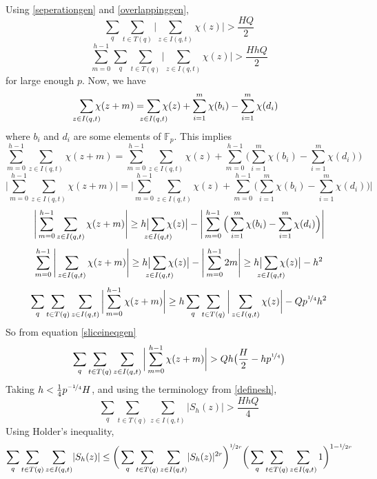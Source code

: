 \documentclass{report}
\begin{document}
Using \ref{seperationgen} and \ref{overlappinggen},
$$\sum_q\sum\limits_{t\in T(q)}\bigg \lvert\sum\limits_{z\in I(q,t)}\chi(z)\bigg \rvert >\frac{HQ}{2}$$
\begin{equation}
\sum\limits_{m=0}^{h-1}\sum_q\sum\limits_{t\in T(q)}\bigg \lvert\sum\limits_{z\in I(q,t)}\chi(z)\bigg \rvert > \frac{HhQ}{2}
\end{equation} \label{sliceineqgen}
for large enough $p$. Now, we have
$$\sum\limits_{\mathclap {z\in I(q,t)}}\chi(z+m)= \sum\limits_{\mathclap{z\in I(q,t)}}\chi(z) + \sum\limits_{i=1}^m\chi(b_i)-\sum\limits_{i=1}^m\chi(d_i)$$
where $b_i$ and $d_i$ are some elements of $\mathbb{F}_p$. This implies
$$\sum\limits_{m=0}^{h-1}\sum\limits_{z\in I(q,t)}\chi(z+m)= \sum\limits_{m=0}^{h-1}\sum\limits_{z\in I(q,t)}\chi(z) + \sum\limits_{m=0}^{h-1}\Big(\sum\limits_{i=1}^m\chi(b_i)-\sum\limits_{i=1}^m\chi(d_i)\Big)$$
$$\Bigg\lvert\sum\limits_{m=0}^{h-1}\sum\limits_{z\in I(q,t)}\chi(z+m)\Bigg\rvert= \Bigg\lvert\sum\limits_{m=0}^{h-1} \sum\limits_{z\in I(q,t)}\chi(z) + \sum\limits_{m=0}^{h-1}\Big(\sum\limits_{i=1}^m\chi(b_i)-\sum\limits_{i=1}^m \chi(d_i)\Big)\Bigg\rvert$$
$$\Bigg\lvert\sum\limits_{m=0}^{h-1}\sum\limits_{z\in I(q,t)}\chi(z+m)\Bigg\rvert \geq h\big\lvert\sum\limits_{\mathclap{ z\in I(q,t)}}\chi(z)\big\rvert -\Bigg\lvert\sum\limits_{m=0}^{h-1}\Big(\sum\limits_{i=1}^m\chi(b_i)-\sum\limits_{i=1}^m \chi(d_i)\Big)\Bigg\rvert$$
$$\sum\limits_{m=0}^{h-1}\Bigg\lvert\sum\limits_{z\in I(q,t)}\chi(z+m)\Bigg\rvert \geq h\big\lvert\sum\limits_{\mathclap{ z\in I(q,t)}}\chi(z)\big\rvert -\Bigg\lvert\sum\limits_{m=0}^{h-1}2m\Bigg\rvert \geq h\big\lvert\sum\limits_{\mathclap{z\in I(q,t)}}\chi(z)\big\rvert -h^2$$
$$\sum_q\sum\limits_{t\in T(q)}\sum\limits_{z\in I(q,t)}\bigg \lvert \sum\limits_{m=0}^{h-1}\chi(z+m) \bigg \rvert \geq h\sum_q\sum\limits_{t\in T(q)}\bigg \lvert \sum\limits_{z\in I(q,t)}\chi(z)\bigg \rvert-Qp^{\nicefrac{1}{4}}h^2$$
So from equation \ref{sliceineqgen}
$$\sum_q\sum\limits_{t\in T(q)}\sum\limits_{z\in I(q,t)}\bigg \lvert \sum\limits_{m=0}^{h-1}\chi(z+m) \bigg \rvert > Qh\big(\frac{H}{2}-hp^{\nicefrac{1}{4}}\big)$$
Taking $h<\frac{1}{4}p^{\nicefrac{-1}{4}}H$, and using the terminology from \ref{definesh},
$$\sum_q\sum\limits_{t\in T(q)}\sum\limits_{z\in I(q,t)}\lvert S_h(z) \rvert > \frac{HhQ}{4}$$
Using Holder's inequality,
$$\sum_q\sum\limits_{t\in T(q)}\sum\limits_{z\in I(q,t)}\lvert S_h(z) \rvert \leq \bigg ( \sum_q\sum\limits_{t\in T(q)}\sum\limits_{z\in I(q,t)}\lvert S_h(z) \rvert^{2r} \bigg )^{\nicefrac{1}{2r}}\bigg ( \sum_q\sum\limits_{t\in T(q)}\sum\limits_{z\in I(q,t)}1 \bigg )^{1-\nicefrac{1}{2r}}$$
\end{document}
